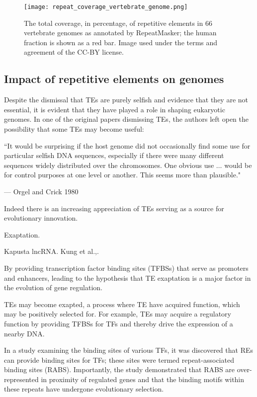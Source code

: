 \begin{figure}[!ht]
   \centering
   \texttt{[image: repeat\_coverage\_vertebrate\_genome.png]}
   \caption[Coverage of repetitive elements in vertebrate genomes]{The total coverage, in percentage, of repetitive elements in 66 vertebrate genomes as annotated by RepeatMasker; the human fraction is shown as a red bar\cite{tang2014repcoverage}. Image used under the terms and agreement of the CC-BY license.}
   \label{fig:repeat_coverage_vertebrate_genome}
\end{figure}

\subsection{Impact of repetitive elements on genomes}

Despite the dismissal that TEs are purely selfish and evidence that they are not essential, it is evident that they have played a role in shaping eukaryotic genomes. In one of the original papers dismissing TEs, the authors left open the possibility that some TEs may become useful:

\epigraph{``It would be surprising if the host genome did not occasionally find some use for particular selfish DNA sequences, especially if there were many different sequences widely distributed over the chromosomes. One obvious use $\ldots$ would be for control purposes at one level or another. This seems more than plausible."}{--- \textup{Orgel and Crick 1980}}

Indeed there is an increasing appreciation of TEs serving as a source for evolutionary innovation\cite{Muotri15102007, pmid18368054}.

Exaptation\cite{Gould01011982}.

Kapusta lncRNA\cite{pmid23637635}. Kung et al.,\cite{pmid23463798}.

By providing transcription factor binding sites (TFBSs) that serve as promoters and enhancers, leading to the hypothesis that TE exaptation is a major factor in the evolution of gene regulation\cite{pmid23486611}.

TEs may become exapted, a process where TE have acquired function, which may be positively selected for. For example, TEs may acquire a regulatory function by providing TFBSs for TFs and thereby drive the expression of a nearby DNA.

In a study examining the binding sites of various TFs, it was discovered that REs can provide binding sites for TFs; these sites were termed repeat-associated binding sites (RABS)\cite{pmid18682548}. Importantly, the study demonstrated that RABS are over-represented in proximity of regulated genes and that the binding motifs within these repeats have undergone evolutionary selection.

